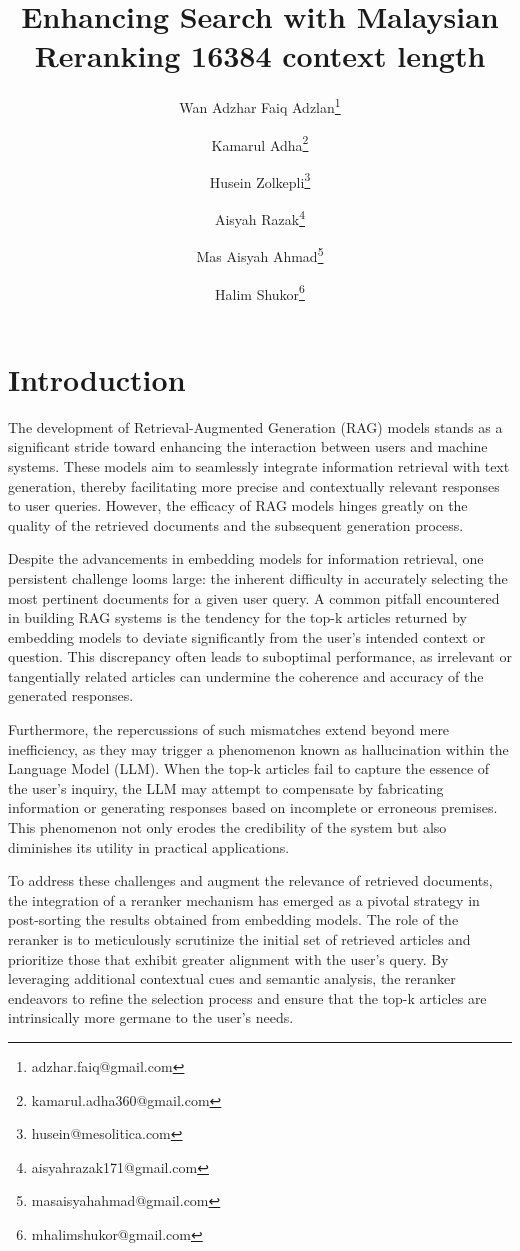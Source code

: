 \documentclass[preprint]{article}
\title{Enhancing Search with Malaysian Reranking 16384 context length}
\author{
  Wan Adzhar Faiq Adzlan\thanks{adzhar.faiq@gmail.com} \and
  Kamarul Adha\thanks{kamarul.adha360@gmail.com} \and
  Husein Zolkepli\thanks{husein@mesolitica.com} \and
  Aisyah Razak\thanks{aisyahrazak171@gmail.com} \and
  Mas Aisyah Ahmad\thanks{masaisyahahmad@gmail.com} \and
  Halim Shukor\thanks{mhalimshukor@gmail.com} \and
}
\begin{document}
\maketitle

\begin{abstract}


\end{abstract}

\section{Introduction}

The development of Retrieval-Augmented Generation (RAG) models stands as a significant stride toward enhancing the interaction between users and machine systems. These models aim to seamlessly integrate information retrieval with text generation, thereby facilitating more precise and contextually relevant responses to user queries. However, the efficacy of RAG models hinges greatly on the quality of the retrieved documents and the subsequent generation process.

Despite the advancements in embedding models for information retrieval, one persistent challenge looms large: the inherent difficulty in accurately selecting the most pertinent documents for a given user query. A common pitfall encountered in building RAG systems is the tendency for the top-k articles returned by embedding models to deviate significantly from the user's intended context or question. This discrepancy often leads to suboptimal performance, as irrelevant or tangentially related articles can undermine the coherence and accuracy of the generated responses.

Furthermore, the repercussions of such mismatches extend beyond mere inefficiency, as they may trigger a phenomenon known as hallucination within the Language Model (LLM). When the top-k articles fail to capture the essence of the user's inquiry, the LLM may attempt to compensate by fabricating information or generating responses based on incomplete or erroneous premises. This phenomenon not only erodes the credibility of the system but also diminishes its utility in practical applications.

To address these challenges and augment the relevance of retrieved documents, the integration of a reranker mechanism has emerged as a pivotal strategy in post-sorting the results obtained from embedding models. The role of the reranker is to meticulously scrutinize the initial set of retrieved articles and prioritize those that exhibit greater alignment with the user's query. By leveraging additional contextual cues and semantic analysis, the reranker endeavors to refine the selection process and ensure that the top-k articles are intrinsically more germane to the user's needs.
\end{document}

